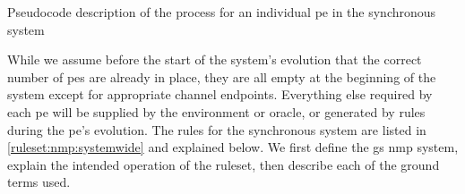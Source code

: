 
\begin{algorithm}
\DontPrintSemicolon
{}
\caption{\label{alg:nmp:systemwide2}Pseudocode description of the process for an individual \gls{pe} in the synchronous system}
\end{algorithm}

While we assume before the start of the system's evolution that the correct number of \glspl{pe} are already in place, they are all empty at the beginning of the system except for appropriate channel endpoints.  Everything else required by each \gls{pe} will be supplied by the environment or oracle, or generated by rules during the \gls{pe}'s evolution.  The rules for the synchronous system are listed in \autoref{ruleset:nmp:systemwide} and explained below.  We first define the \gls{gs} \gls{nmp} system, explain the intended operation of the ruleset, then describe each of the ground terms used.


